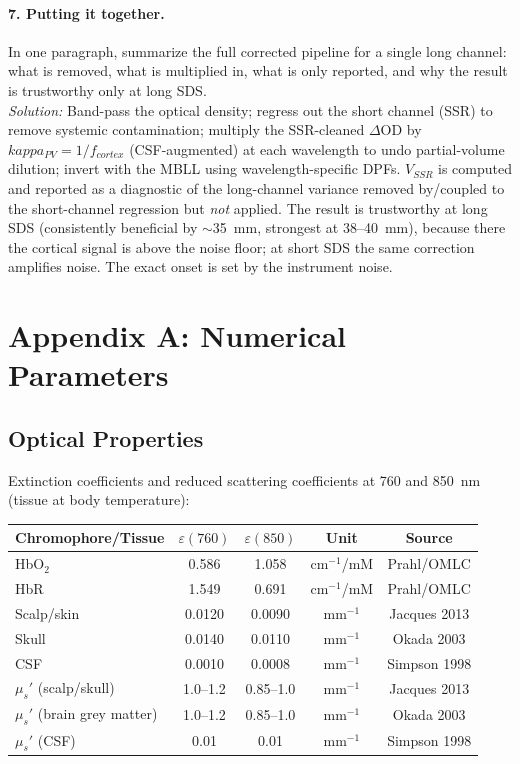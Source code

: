 \documentclass[12pt]{article}
\def\kappa{kappa}%
\def\text#1{#1}%
\begin{document}
\paragraph{7. Putting it together.} In one paragraph, summarize the full corrected pipeline for a single long channel: what is removed, what is multiplied in, what is only reported, and why the result is trustworthy only at long SDS.\\
\textit{Solution:} Band-pass the optical density; regress out the short channel (SSR) to remove systemic contamination; multiply the SSR-cleaned $\Delta$OD by $\kappa_{\text{PV}}=1/f_{\text{cortex}}$ (CSF-augmented) at each wavelength to undo partial-volume dilution; invert with the MBLL using wavelength-specific DPFs. $V_{\text{SSR}}$ is computed and reported as a diagnostic of the long-channel variance removed by/coupled to the short-channel regression but \emph{not} applied. The result is trustworthy at long SDS (consistently beneficial by $\sim$35~mm, strongest at 38--40~mm), because there the cortical signal is above the noise floor; at short SDS the same correction amplifies noise. The exact onset is set by the instrument noise.

\newpage
\appendix

\section{Appendix A: Numerical Parameters}

\subsection{Optical Properties}

Extinction coefficients and reduced scattering coefficients at 760 and 850~nm (tissue at body temperature):

\begin{center}
\begin{tabular}{lcccc}
\hline
\textbf{Chromophore/Tissue} & $\varepsilon(760)$ & $\varepsilon(850)$ & Unit & Source \\
\hline
HbO$_2$ & 0.586 & 1.058 & cm$^{-1}$/mM & Prahl/OMLC \\
HbR & 1.549 & 0.691 & cm$^{-1}$/mM & Prahl/OMLC \\
\hline
Scalp/skin & 0.0120 & 0.0090 & mm$^{-1}$ & Jacques 2013 \\
Skull & 0.0140 & 0.0110 & mm$^{-1}$ & Okada 2003 \\
CSF & 0.0010 & 0.0008 & mm$^{-1}$ & Simpson 1998 \\
\hline
$\mu_s'$ (scalp/skull) & 1.0--1.2 & 0.85--1.0 & mm$^{-1}$ & Jacques 2013 \\
$\mu_s'$ (brain grey matter) & 1.0--1.2 & 0.85--1.0 & mm$^{-1}$ & Okada 2003 \\
$\mu_s'$ (CSF) & 0.01 & 0.01 & mm$^{-1}$ & Simpson 1998 \\
\hline
\end{tabular}
\end{center}
\end{document}
